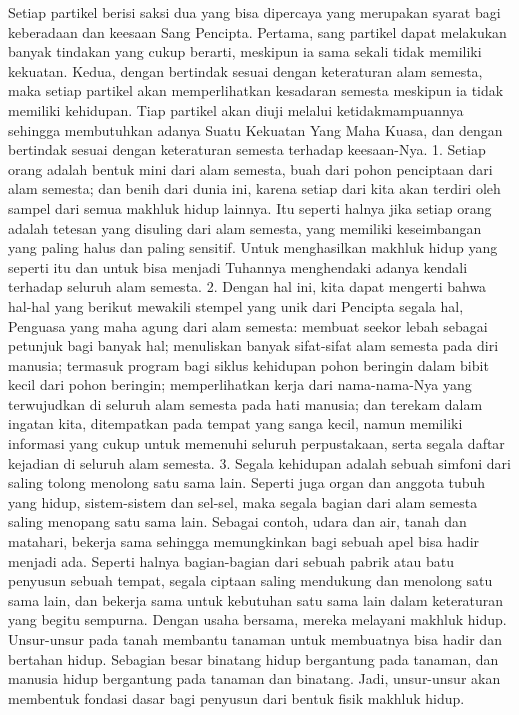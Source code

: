 \documentclass[]{article}
\begin{document}
Setiap partikel berisi saksi dua yang bisa dipercaya yang merupakan syarat bagi keberadaan dan keesaan Sang Pencipta. Pertama, sang partikel dapat melakukan banyak tindakan yang cukup berarti, meskipun ia  sama sekali tidak memiliki kekuatan. Kedua, dengan bertindak  sesuai dengan keteraturan  alam semesta, maka setiap partikel akan memperlihatkan kesadaran semesta meskipun ia tidak memiliki kehidupan. Tiap partikel akan diuji melalui ketidakmampuannya sehingga membutuhkan adanya Suatu Kekuatan Yang Maha Kuasa, dan dengan bertindak sesuai dengan keteraturan semesta terhadap keesaan-Nya. 
1. Setiap orang adalah bentuk mini dari alam semesta, buah dari pohon penciptaan dari alam semesta; dan benih dari dunia ini, karena setiap dari kita akan terdiri oleh sampel dari semua makhluk hidup lainnya. Itu seperti halnya jika setiap orang adalah tetesan yang disuling dari alam semesta, yang memiliki keseimbangan yang paling halus dan paling sensitif. Untuk menghasilkan makhluk hidup yang seperti itu dan untuk bisa menjadi Tuhannya menghendaki adanya kendali terhadap seluruh alam semesta.
2. Dengan hal ini, kita dapat mengerti bahwa hal-hal yang berikut mewakili stempel yang unik dari Pencipta segala hal, Penguasa yang maha agung dari alam semesta: membuat seekor lebah sebagai petunjuk bagi banyak hal; menuliskan banyak sifat-sifat alam semesta pada diri manusia;  termasuk program bagi siklus kehidupan pohon beringin dalam bibit kecil dari pohon beringin; memperlihatkan kerja dari nama-nama-Nya yang terwujudkan di seluruh alam semesta pada hati manusia; dan terekam dalam ingatan kita, ditempatkan pada tempat yang sanga kecil, namun memiliki informasi yang cukup untuk memenuhi seluruh perpustakaan, serta segala daftar kejadian di seluruh alam semesta.
3. Segala kehidupan adalah sebuah simfoni dari saling tolong menolong satu sama lain. Seperti juga organ dan anggota tubuh yang hidup, sistem-sistem dan sel-sel, maka segala bagian dari alam semesta saling menopang satu sama lain. Sebagai contoh, udara dan air, tanah dan matahari, bekerja sama sehingga memungkinkan bagi sebuah apel bisa hadir menjadi ada. Seperti halnya bagian-bagian dari sebuah pabrik atau batu penyusun sebuah tempat, segala ciptaan saling mendukung dan menolong satu sama lain, dan bekerja sama untuk kebutuhan satu sama lain dalam keteraturan yang begitu sempurna. Dengan usaha bersama, mereka melayani makhluk hidup. Unsur-unsur pada tanah membantu tanaman untuk membuatnya bisa hadir dan bertahan hidup. Sebagian besar binatang hidup bergantung pada tanaman, dan manusia hidup bergantung pada tanaman dan binatang. Jadi, unsur-unsur akan membentuk fondasi dasar bagi penyusun dari bentuk fisik makhluk hidup.
\end{document}
